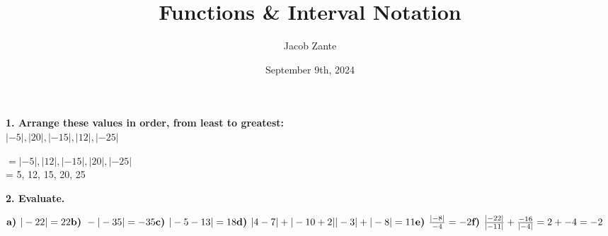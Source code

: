 \documentclass[14pt, a4paper]{extarticle}
\title{Functions \& Interval Notation}
\author{Jacob Zante}
\date{September 9th, 2024}
\begin{document}
\maketitle
\setlength{\parindent}{0pt}



\textbf{1. Arrange these values in order, from least to greatest: } \\
\textbf{$|-5|, |20|, |-15|, |12|, |-25|$} \\
\begin{adjustwidth}{1cm}{0pt}
    $= |-5|, |12|, |-15|, |20|, |-25|$ \\
    = 5, 12, 15, 20, 25 \\
\end{adjustwidth}

\textbf{2. Evaluate.} \\
\begin{adjustwidth}{1cm}{0pt}
    \begin{math}
        \textbf{a) } |-22| \\
        = 22 \\
        \\
        \textbf{b) } -|-35| \\
        = -35 \\
        \\
        \textbf{c) } |-5 - 13| \\
        = 18 \\
        \\
        \textbf{d) } |4 - 7| + |-10 + 2| \\
        |-3| + |-8| \\
        = 11 \\
        \\
        \textbf{e) } \frac{|-8|}{-4} \\
        = -2 \\
        \\
        \textbf{f) } \frac{|-22|}{|-11|} + \frac{-16}{|-4|} \\
        = 2 + -4 \\
        = -2 \\
    \end{math}
\end{adjustwidth}
\end{document}
